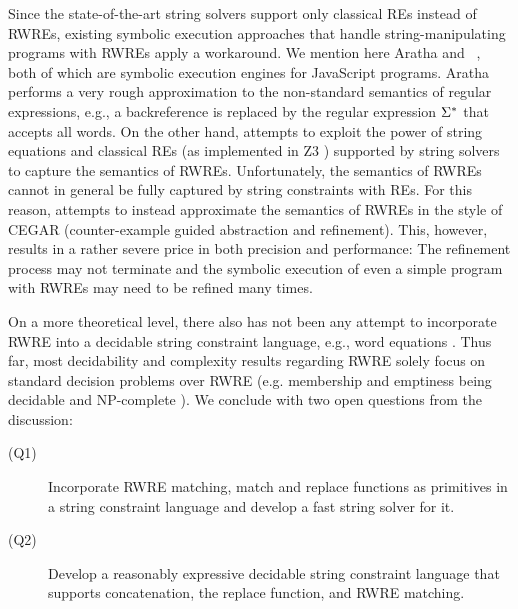 Since the state-of-the-art string solvers support only classical REs instead of
RWREs, %
existing symbolic execution approaches that handle
string-manipulating programs with RWREs apply a workaround.
We mention here Aratha \cite{aratha} and \expose~\cite{LMK19}, both of which are
symbolic execution engines for JavaScript programs.
Aratha performs a very rough approximation to the 
non-standard semantics of regular expressions, e.g., a backreference
is replaced by the regular expression $\Sigma^*$ that accepts all words.
On the other hand, \expose{} attempts to exploit the power of string 
equations and classical REs (as implemented in Z3 \cite{Z3}) supported by string
solvers to capture the 
semantics of RWREs. Unfortunately, the semantics of RWREs cannot 
in general be fully captured by string constraints with REs. 
For this reason, 
\expose{} attempts to instead approximate the semantics of RWREs in the style of 
CEGAR (counter-example guided abstraction and refinement). This, however,
results in a rather severe price in both precision and performance: The
refinement process may not terminate and the symbolic execution of even a simple
program with RWREs may need to be refined many times.

On a more theoretical level, there also has not been any attempt to incorporate
RWRE into a decidable string constraint language, e.g., word equations
\cite{Gut98}. Thus far, most decidability and complexity results regarding RWRE 
solely focus on standard decision problems over RWRE (e.g. membership and 
emptiness being decidable and NP-complete \cite{FS19,BM17b}). 
We conclude with two open questions from the discussion:
\begin{description}
    \item[(Q1)] Incorporate RWRE matching, match and replace functions
        as primitives in a string constraint language and develop a 
        fast string solver for it.
    \item[(Q2)] Develop a reasonably expressive decidable string constraint 
        language that supports concatenation, the replace function, and RWRE
        matching.
\end{description}

